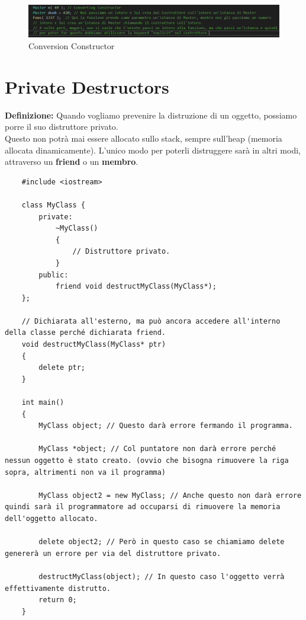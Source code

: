 \begin{figure}[H]
	\centering
	\includegraphics[width=1\textwidth, height=1\textheight, keepaspectratio]{./imgs/Conversion_Constructor.png}
	\caption{Conversion Constructor}
	\label{fig:Conversion_Constructor}
\end{figure}


\section{Private Destructors} %

\textsf{\small \textbf{Definizione: } Quando vogliamo prevenire la distruzione di un oggetto, possiamo porre il suo distruttore privato.} \\

\textsf{\small Questo non potrà mai essere allocato sullo stack, sempre sull'heap (memoria allocata dinamicamente). L'unico modo per poterli distruggere sarà in altri modi, attraverso un \textbf{friend} o un \textbf{membro}.} \\

\begin{lstlisting}
	#include <iostream>
	
	class MyClass {
		private:
			~MyClass() 
			{
				// Distruttore privato.
			}
		public:
			friend void destructMyClass(MyClass*);
	};

	// Dichiarata all'esterno, ma può ancora accedere all'interno della classe perché dichiarata friend.
	void destructMyClass(MyClass* ptr)
	{
		delete ptr;
	}

	int main()
	{
		MyClass object; // Questo darà errore fermando il programma.
		
		MyClass *object; // Col puntatore non darà errore perché nessun oggetto è stato creato. (ovvio che bisogna rimuovere la riga sopra, altrimenti non va il programma)
		
		MyClass object2 = new MyClass; // Anche questo non darà errore quindi sarà il programmatore ad occuparsi di rimuovere la memoria dell'oggetto allocato.
		
		delete object2; // Però in questo caso se chiamiamo delete genererà un errore per via del distruttore privato.
		
		destructMyClass(object); // In questo caso l'oggetto verrà effettivamente distrutto.
		return 0;
	}
\end{lstlisting}

